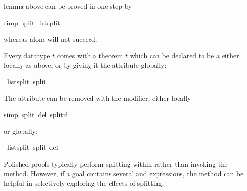\begin{isabellebody}
\begin{isamarkuptxt}
lemma above can be proved in one step by%
\end{isamarkuptxt}%
\isamarkuptrue%
%
\endisatagproof
{\isafoldproof}%
%
\isadelimproof
%
\endisadelimproof
%
\isadelimproof
%
\endisadelimproof
%
\isatagproof
{}\isamarkupfalse%
{}simp\ split{}\ list{}split{}%
\endisatagproof
{\isafoldproof}%
%
\isadelimproof
%
\endisadelimproof
%
\begin{isamarkuptext}%
\noindent
whereas  alone will not succeed.

Every datatype $t$ comes with a theorem
$t$ which can be declared to be a  either
locally as above, or by giving it the  attribute globally:%
\end{isamarkuptext}%
\isamarkuptrue%
\isamarkupfalse%
\ list{}split\ {}split{}%
\begin{isamarkuptext}%
\noindent
The  attribute can be removed with the  modifier,
either locally%
\end{isamarkuptext}%
\isamarkuptrue%
%
\isadelimproof
%
\endisadelimproof
%
\isatagproof
{}\isamarkupfalse%
{}simp\ split\ del{}\ split{}if{}%
\endisatagproof
{\isafoldproof}%
%
\isadelimproof
%
\endisadelimproof
%
\begin{isamarkuptext}%
\noindent
or globally:%
\end{isamarkuptext}%
\isamarkuptrue%
\isamarkupfalse%
\ list{}split\ {}split\ del{}%
\begin{isamarkuptext}%
Polished proofs typically perform splitting within  rather than 
invoking the  method.  However, if a goal contains
several  and  expressions, 
the  method can be
helpful in selectively exploring the effects of splitting.


\end{isamarkuptext}
\end{isabellebody}
